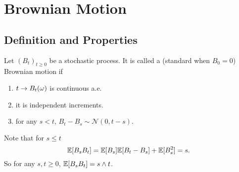 \chapter{Brownian Motion}

\section{Definition and Properties}

\begin{defn}
    Let $(B_t)_{t \geq 0}$ be a stochastic process. It is called a (standard when $B_0 = 0$) Brownian motion if
    \begin{enumerate}[label=(\arabic{*})]
        \item $t \rightarrow B_t(\omega)$ is continuous a.e.
        \item it is independent increments.
        \item for any $s < t$, $B_t - B_s \sim \mathcal{N}(0,t-s)$.
    \end{enumerate}
\end{defn}
\begin{rmk}
    Note that for $s \leq t$
    \begin{equation*}
        \mathbb{E}[B_sB_t] = \mathbb{E}[B_s]\mathbb{E}[B_t - B_s]+\mathbb{E}[B_s^2] = s.
    \end{equation*}
    So for any $s,t \geq 0$, $\mathbb{E}[B_sB_t] = s \wedge t$.
\end{rmk}

